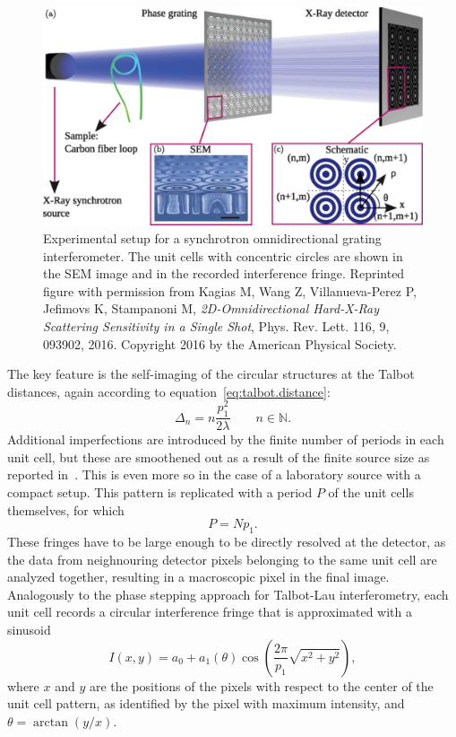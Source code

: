 \begin{figure}[htb]
    \centering
    \includegraphics[width=\textwidth]{gfx/omnidirectional/synchrotron-design.png}
    \caption{Experimental setup for a synchrotron omnidirectional grating
    interferometer. The unit cells with concentric circles are shown in the
    \ac{SEM} image and in the recorded interference fringe. Reprinted figure
with permission from Kagias M, Wang Z, Villanueva-Perez P, Jefimovs K,
Stampanoni M, \emph{2D-Omnidirectional Hard-X-Ray Scattering Sensitivity in
a Single Shot}, Phys. Rev. Lett. 116, 9, 093902, 2016. Copyright 2016 by the
American Physical Society.}
    \label{fig:omnidirectional-synchrotron}
\end{figure}

The key feature is the self-imaging of the circular structures 
at the Talbot distances, again according to
equation~\ref{eq:talbot.distance}:
\begin{equation*}
    \Delta_n = n \frac{p_1^2}{2 \lambda} \qquad n \in
    \mathbb{N}.
\end{equation*}
Additional imperfections are introduced by the finite number of periods in
each unit cell, but these are smoothened out as a result of the finite
source size as reported in~\cite{PhysRevLett.116.093902}. This is even
more so in the case of a laboratory source with a compact setup.
This pattern is replicated with a period $P$ of the unit cells themselves,
for which
\begin{equation}
    P = Np_1.
    \label{eq:unit.cell.periop}
\end{equation}
These fringes have to be large enough to be directly resolved at the
detector, as the data from neighnouring detector pixels belonging to the same
unit cell are analyzed together, resulting in a macroscopic pixel in the final image. Analogously to
the phase stepping approach for Talbot-Lau interferometry, each unit cell
records a circular interference fringe that is approximated with a sinusoid
\begin{equation}
    I(x, y) = a_0 + a_1(\theta)\cos\left(\frac{2\pi}{p_1} \sqrt{x^2 +
    y^2}\right),
    \label{eq:omnidirectional.periodical.signal}
\end{equation}
where $x$ and $y$ are the positions of the pixels with respect to the center
of the unit cell pattern, as identified by the pixel with maximum intensity,
and $\theta = \arctan(y/x)$.

